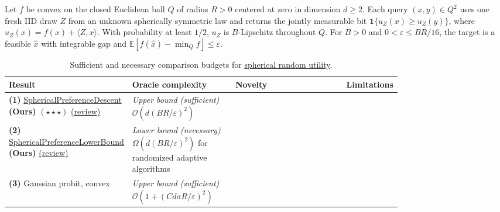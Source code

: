 \begin{table}[tp]
\centering
\caption{Sufficient and necessary comparison budgets for \href{https://github.com/k3nfalt/longtails/blob/main/LongTails/Setups/SphericalRandomUtility.lean}{spherical random utility}.}\label{tab:SphericalRandomUtility}
\parbox{\linewidth}{\footnotesize Let $f$ be convex on the closed Euclidean ball $Q$ of radius $R>0$ centered at zero in dimension $d\ge2$. Each query $(x,y)\in Q^2$ uses one fresh IID draw $Z$ from an unknown spherically symmetric law and returns the jointly measurable bit $\mathbf{1}\{u_Z(x)\ge u_Z(y)\}$, where $u_Z(x)=f(x)+\langle Z,x\rangle$. With probability at least $1/2$, $u_Z$ is $B$-Lipschitz throughout $Q$. For $B>0$ and $0<\varepsilon\le BR/16$, the target is a feasible $\hat x$ with integrable gap and $\mathbb E[f(\hat x)-\min_Q f]\le\varepsilon$.}\par\smallskip
\begin{threeparttable}
\footnotesize
\setlength{\tabcolsep}{4pt}\renewcommand{\arraystretch}{1.25}
\begin{tabularx}{\linewidth}{@{}>{\raggedright\arraybackslash}p{0.19\linewidth}>{\raggedright\arraybackslash}p{0.27\linewidth}>{\raggedright\arraybackslash}p{0.32\linewidth}>{\raggedright\arraybackslash}X@{}}
\toprule
\textbf{Result} & \textbf{Oracle complexity} & \textbf{Novelty} & \textbf{Limitations} \\
\midrule
\textbf{(1)} \href{https://github.com/k3nfalt/longtails/blob/main/LongTails/Theorems/SphericalPreferenceDescent.lean}{Spherical\allowbreak Preference\allowbreak Descent} \textbf{(Ours)} $(\star\star\star)$ \href{https://github.com/k3nfalt/longtails/blob/main/scripts/reviews/SphericalPreferenceDescent.md}{(review)}
& \textit{Upper bound (sufficient)}\newline $\mathcal{O}(d(BR/\varepsilon)^2)$ & & \\
\midrule
\textbf{(2)} \href{https://github.com/k3nfalt/longtails/blob/main/LongTails/Theorems/SphericalPreferenceLowerBound.lean}{Spherical\allowbreak Preference\allowbreak Lower\allowbreak Bound} \textbf{(Ours)} \href{https://github.com/k3nfalt/longtails/blob/main/scripts/reviews/SphericalPreferenceLowerBound.md}{(review)}
& \textit{Lower bound (necessary)}\newline $\Omega(d(BR/\varepsilon)^2)$ for randomized adaptive algorithms & & \\
\midrule[1.2pt]
\textbf{(3)} \citep[Thm.~2(a)]{sruKovalev2026v1} Gaussian probit, convex
& \textit{Upper bound (sufficient)}\newline $\mathcal{O}(1+(Cd\sigma R/\varepsilon)^2)$

\end{tabularx}
\end{threeparttable}
\end{table}
